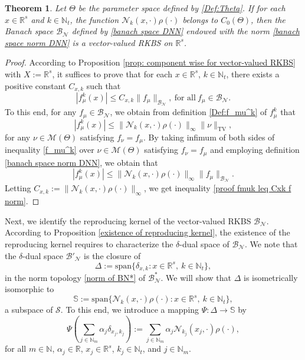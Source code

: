 \documentclass[11pt]{article}
\newtheorem{theorem}{Theorem}
\begin{document}
\begin{theorem}\label{theorem: BN vector valued RKBS}
Let $\Theta$ be the parameter space defined by \eqref{Def:Theta}. If  
for each $x\in \mathbb{R}^s$ and $k\in\mathbb{N}_t$, the function $\mathcal{N}_k({x},\cdot)\rho(\cdot)$ belongs to $C_0(\Theta)$, then the Banach space $\mathcal{B}_{\mathcal{N}}$ defined by \eqref{banach space DNN} endowed with the norm \eqref{banach space norm DNN} is a vector-valued RKBS on $\mathbb{R}^s$.
\end{theorem}
\begin{proof}
According to Proposition \ref{prop: component wise for vector-valued RKBS} with $X:=\mathbb{R}^s$, it suffices to prove that for each $x\in\mathbb{R}^s$, $k\in\mathbb{N}_t$, there exists a positive constant $C_{x,k}$ such that
\begin{equation}\label{proof fmuk leq Cxk f norm}
    |f_\mu^k(x)|\leq C_{x,k}\|f_\mu\|_{\mathcal{B}_{\mathcal{N}}}, \ \mbox{for all}\ f_{\mu}\in\mathcal{B}_\mathcal{N}.
\end{equation}
To this end, for any $f_{\mu}\in\mathcal{B}_\mathcal{N}$, we obtain from definition \eqref{Def:f_mu^k} of $f_\mu^k$ that 
\begin{equation}\label{f_mu^k}
|f_\mu^k({x})|\leq \|\mathcal{N}_k({x},\cdot)\rho(\cdot)\|_\infty\|\nu\|_{\mathrm{TV}},
\end{equation}
for any $\nu\in\mathcal{M}(\Theta)$ satisfying $f_\nu=f_\mu$.  
By taking infimum of both sides of inequality \eqref{f_mu^k} over $\nu\in\mathcal{M}(\Theta)$ satisfying $f_\nu=f_\mu$ and employing definition \eqref{banach space norm DNN}, we obtain that 
$$
|f_\mu^k({x})|\leq\|\mathcal{N}_k({x},\cdot)\rho(\cdot)\|_\infty\|f_\mu\|_{\mathcal{B}_{\mathcal{N}}}.
$$
Letting $C_{x,k}:=\|\mathcal{N}_k({x},\cdot)\rho(\cdot)\|_\infty$, we get inequality \eqref{proof fmuk leq Cxk f norm}.
\end{proof}

Next, we identify %
the reproducing kernel of the vector-valued RKBS $\mathcal{B}_{\mathcal{N}}$. According to Proposition \ref{existence of reproducing kernel}, the existence of the reproducing kernel requires to characterize the $\delta$-dual space of $\mathcal{B}_{\mathcal{N}}$.  
We note that the $\delta$-dual space  $\mathcal{B}'_{\mathcal{N}}$ is the closure of  
\begin{equation*}\label{delta dual for BN}
\Delta:=\mathrm{span}\{\delta_{x,k}:x\in\mathbb{R}^s,\ k\in\mathbb{N}_t\},
\end{equation*}
in the norm topology \eqref{norm of BN*} of $\mathcal{B}_{\mathcal{N}}^*$. 
We will show that $\Delta$ is isometrically isomorphic to  
$$
\mathbb{S}:=\mathrm{span}\{\mathcal{N}_k({x},\cdot)\rho(\cdot):{x}\in\mathbb{R}^s,\ k\in\mathbb{N}_t\},
$$
a subspace of $\mathcal{S}$.   To this end, we introduce a mapping $\Psi:\Delta\to \mathbb{S}$ by 
\begin{equation}\label{isometric isomorphism_delta_KX}   \Psi\left(\sum_{j\in\mathbb{N}_m}\alpha_{j}\delta_{{x}_j,k_j}\right):= \sum_{j\in\mathbb{N}_m}\alpha_{j} \mathcal{N}_{k_j}({x}_j,\cdot)\rho(\cdot),
\end{equation}
for all $m\in\mathbb{N}$, $\alpha_{j}\in\mathbb{R}$, ${x}_j\in\mathbb{R}^s$, $k_j\in\mathbb{N}_t$, and $j\in\mathbb{N}_m$. 
\end{document}
